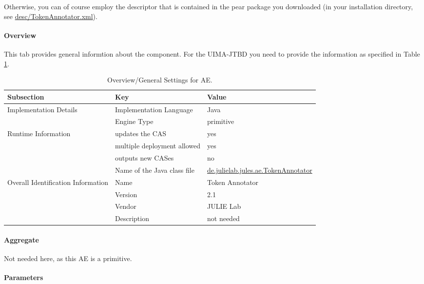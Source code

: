 \documentclass[11pt,a4paper,halfparskip]{scrartcl}
\begin{document}
Otherwise, you can of course employ the descriptor that is contained
in the pear package you downloaded (in your installation directory, see
\url{desc/TokenAnnotator.xml}).

\paragraph{Overview}
This tab provides general informtion about the component. For the
UIMA-JTBD you need to provide the information as specified in Table
\ref{tab:overview}.

\begin{table}[h!]
  \centering
  \begin{tabular}{|p{3.5cm}|p{4cm}|p{6cm}|}
    \hline
    Subsection & Key & Value \\
    \hline\hline
    Implementation Details & Implementation Language & Java \\
    \cline{2-3}
    & Engine Type & primitive \\
    \hline
    Runtime Information & updates the CAS & yes \\
    \cline{2-3}
    & multiple deployment allowed & yes \\
    \cline{2-3}
    & outputs new CASes &  no \\
    \cline{2-3}
    & Name of the Java class file & \url{de.julielab.jules.ae.TokenAnnotator}\\
    \hline
    Overall Identification Information & Name &  Token Annotator \\
    \cline{2-3}
    & Version &  2.1 \\
    \cline{2-3}
    & Vendor & JULIE Lab\\
    \cline{2-3}
    & Description & not needed\\
    \hline
  \end{tabular}
  \caption{Overview/General Settings for AE.}
  \label{tab:overview}
\end{table}


\paragraph{Aggregate}
Not needed here, as this AE is a primitive.

\paragraph{Parameters}
\label{sss:parameters}
\end{document}
